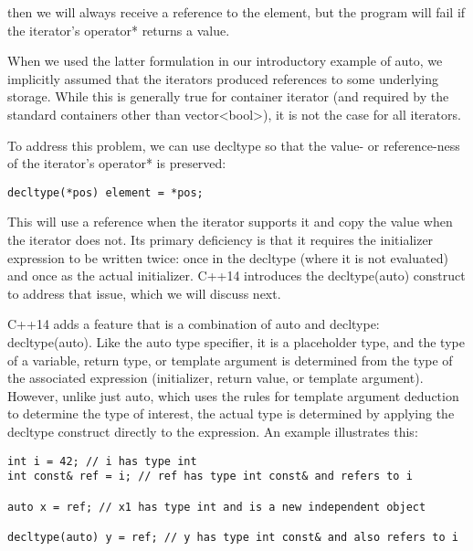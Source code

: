 then we will always receive a reference to the element, but the program will fail if the iterator’s operator* returns a value.

\begin{tcolorbox}[colback=webgreen!5!white,colframe=webgreen!75!black]
\hspace*{0.75cm}When we used the latter formulation in our introductory example of auto, we implicitly assumed that the iterators produced references to some underlying storage. While this is generally true for container iterator (and required by the standard containers other than vector<bool>), it is not the case for all iterators.
\end{tcolorbox}

To address this problem, we can use decltype so that the value- or reference-ness of the iterator’s operator* is preserved:

\begin{lstlisting}[style=styleCXX]
decltype(*pos) element = *pos;
\end{lstlisting}

This will use a reference when the iterator supports it and copy the value when the iterator does not. Its primary deficiency is that it requires the initializer expression to be written twice: once in the decltype (where it is not evaluated) and once as the actual initializer. C++14 introduces the decltype(auto) construct to address that issue, which we will discuss next.


C++14 adds a feature that is a combination of auto and decltype: decltype(auto). Like the auto type specifier, it is a placeholder type, and the type of a variable, return type, or template argument is determined from the type of the associated expression (initializer, return value, or template argument). However, unlike just auto, which uses the rules for template argument deduction to determine the type of interest, the actual type is determined by applying the decltype construct directly to the expression. An example illustrates this:

\begin{lstlisting}[style=styleCXX]
int i = 42; // i has type int
int const& ref = i; // ref has type int const& and refers to i

auto x = ref; // x1 has type int and is a new independent object

decltype(auto) y = ref; // y has type int const& and also refers to i
\end{lstlisting}

